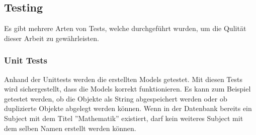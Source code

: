 %


\subsection{Testing}
Es gibt mehrere Arten von Tests, welche durchgeführt wurden, um die Qulität dieser Arbeit zu gewährleisten.

\subsubsection{Unit Tests}
Anhand der Unittests werden die erstellten Models getestet. Mit diesen Tests wird sichergestellt, dass die Models korrekt funktionieren. Es kann zum Beispiel getestet werden, ob die Objekte als String abgespeichert werden oder ob duplizierte Objekte abgelegt werden können. Wenn in der Datenbank bereits ein Subject mit dem Titel ''Mathematik'' existiert, darf kein weiteres Subject mit dem selben Namen erstellt werden können.


